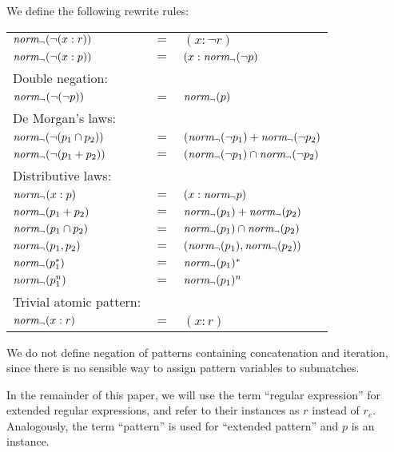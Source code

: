 \begin{defn}
   \label{defn-negnorm}
   We define the following rewrite rules:

   \begin{tabular}{lll}
      $\mathit{norm_\neg}(\neg(x : r))$		& $=$	& $(x : \neg r)$					\\
      $\mathit{norm_\neg}(\neg(x : p))$		& $=$	& $(x : \mathit{norm_\neg}(\neg p)$				\\
      Double negation:			&	&							\\
      $\mathit{norm_\neg}(\neg(\neg p))$		& $=$	& $\mathit{norm_\neg}(p)$						\\
      De Morgan's laws:			&	&							\\
      $\mathit{norm_\neg}(\neg(p_1 \cap p_2))$	& $=$	& $(\mathit{norm_\neg}(\neg p_1) + \mathit{norm_\neg}(\neg p_2)$		\\
      $\mathit{norm_\neg}(\neg(p_1 + p_2))$	& $=$	& $(\mathit{norm_\neg}(\neg p_1) \cap \mathit{norm_\neg}(\neg p_2)$		\\
      Distributive laws:		&	&							\\
      $\mathit{norm_\neg}(x : p)$			& $=$	& $(x : \mathit{norm_\neg} p)$					\\
      $\mathit{norm_\neg}(p_1 + p_2)$		& $=$	& $\mathit{norm_\neg}(p_1) + \mathit{norm_\neg}(p_2)$			\\
      $\mathit{norm_\neg}(p_1 \cap p_2)$		& $=$	& $\mathit{norm_\neg}(p_1) \cap \mathit{norm_\neg}(p_2)$			\\
      $\mathit{norm_\neg}(p_1, p_2)$		& $=$	& $(\mathit{norm_\neg}(p_1), \mathit{norm_\neg}(p_2))$			\\
      $\mathit{norm_\neg}(p_1^*)$			& $=$	& $\mathit{norm_\neg}(p_1)^*$					\\
      $\mathit{norm_\neg}(p_1^n)$			& $=$	& $\mathit{norm_\neg}(p_1)^n$					\\
      Trivial atomic pattern:		&	&							\\
      $\mathit{norm_\neg}(x : r)$			& $=$	& $(x : r)$						\\
   \end{tabular}
\end{defn}

We do not define negation of patterns containing concatenation and iteration,
since there is no sensible way to assign pattern variables to submatches.

In the remainder of this paper, we will use the term ``regular expression''
for extended regular expressions, and refer to their instances as $r$ instead
of $r_e$.  Analogously, the term ``pattern'' is used for ``extended pattern''
and $p$ is an instance.

